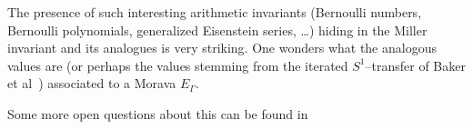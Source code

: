 \begin{remark}
The presence of such interesting arithmetic invariants (Bernoulli numbers, Bernoulli polynomials, generalized Eisenstein series, \ldots) hiding in the Miller invariant and its analogues is very striking.  One wonders what the analogous values are (or perhaps the values stemming from the iterated $S^1$--transfer of Baker et al~\cite{BCGHRW}) associated to a Morava $E_\Gamma$.
\end{remark}

\begin{remark}
Some more open questions about this can be found in 
\end{remark}









